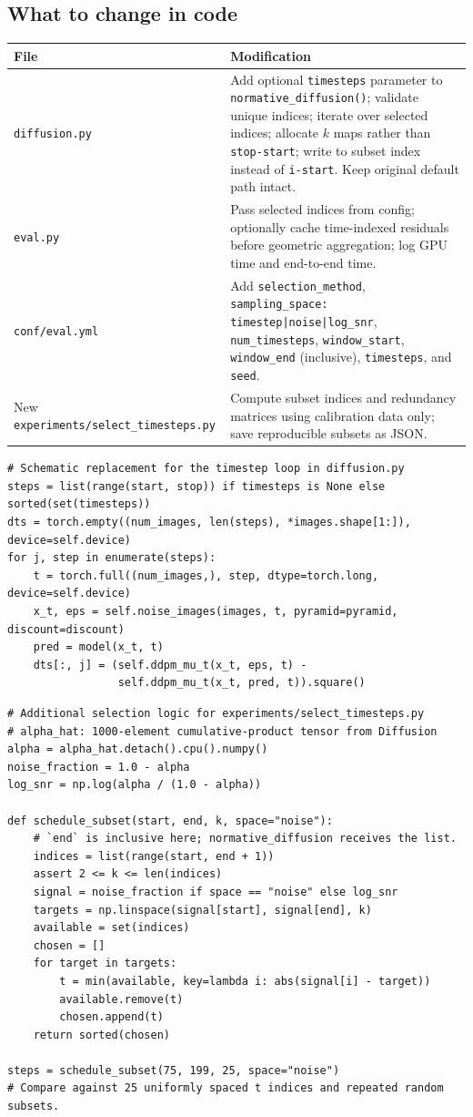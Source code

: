 \documentclass[10pt,a4paper]{article}
\newcommand{\file}[1]{\nolinkurl{#1}}
\begin{document}
\subsection{What to change in code}
\begin{tabularx}{\linewidth}{@{}p{37mm}X@{}}
\toprule File & Modification\\\midrule
\file{diffusion.py} & Add optional \file{timesteps} parameter to \file{normative_diffusion()}; validate unique indices; iterate over selected indices; allocate $k$ maps rather than \file{stop-start}; write to subset index instead of \file{i-start}. Keep original default path intact.\\
\file{eval.py} & Pass selected indices from config; optionally cache time-indexed residuals before geometric aggregation; log GPU time and end-to-end time.\\
\file{conf/eval.yml} & Add \file{selection_method}, \file{sampling_space: timestep|noise|log_snr}, \file{num_timesteps}, \file{window_start}, \file{window_end} (inclusive), \file{timesteps}, and \file{seed}.\\
New \file{experiments/select_timesteps.py} & Compute subset indices and redundancy matrices using calibration data only; save reproducible subsets as JSON.\\\bottomrule
\end{tabularx}
\begin{lstlisting}
# Schematic replacement for the timestep loop in diffusion.py
steps = list(range(start, stop)) if timesteps is None else sorted(set(timesteps))
dts = torch.empty((num_images, len(steps), *images.shape[1:]), device=self.device)
for j, step in enumerate(steps):
    t = torch.full((num_images,), step, dtype=torch.long, device=self.device)
    x_t, eps = self.noise_images(images, t, pyramid=pyramid, discount=discount)
    pred = model(x_t, t)
    dts[:, j] = (self.ddpm_mu_t(x_t, eps, t) -
                 self.ddpm_mu_t(x_t, pred, t)).square()
\end{lstlisting}
\begin{lstlisting}
# Additional selection logic for experiments/select_timesteps.py
# alpha_hat: 1000-element cumulative-product tensor from Diffusion
alpha = alpha_hat.detach().cpu().numpy()
noise_fraction = 1.0 - alpha
log_snr = np.log(alpha / (1.0 - alpha))

def schedule_subset(start, end, k, space="noise"):
    # `end` is inclusive here; normative_diffusion receives the list.
    indices = list(range(start, end + 1))
    assert 2 <= k <= len(indices)
    signal = noise_fraction if space == "noise" else log_snr
    targets = np.linspace(signal[start], signal[end], k)
    available = set(indices)
    chosen = []
    for target in targets:
        t = min(available, key=lambda i: abs(signal[i] - target))
        available.remove(t)
        chosen.append(t)
    return sorted(chosen)

steps = schedule_subset(75, 199, 25, space="noise")
# Compare against 25 uniformly spaced t indices and repeated random subsets.
\end{lstlisting}
\end{document}
